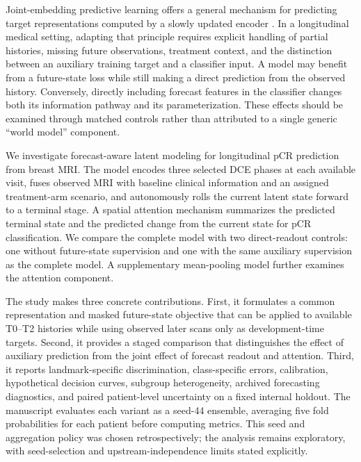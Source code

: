 Joint-embedding predictive learning offers a general mechanism for predicting target representations computed by a slowly updated encoder \citep{jepa2023}. In a longitudinal medical setting, adapting that principle requires explicit handling of partial histories, missing future observations, treatment context, and the distinction between an auxiliary training target and a classifier input. A model may benefit from a future-state loss while still making a direct prediction from the observed history. Conversely, directly including forecast features in the classifier changes both its information pathway and its parameterization. These effects should be examined through matched controls rather than attributed to a single generic ``world model'' component.

We investigate forecast-aware latent modeling for longitudinal pCR prediction from breast MRI. The model encodes three selected DCE phases at each available visit, fuses observed MRI with baseline clinical information and an assigned treatment-arm scenario, and autonomously rolls the current latent state forward to a terminal stage. A spatial attention mechanism summarizes the predicted terminal state and the predicted change from the current state for pCR classification. We compare the complete model with two direct-readout controls: one without future-state supervision and one with the same auxiliary supervision as the complete model. A supplementary mean-pooling model further examines the attention component.

The study makes three concrete contributions. First, it formulates a common representation and masked future-state objective that can be applied to available T0--T2 histories while using observed later scans only as development-time targets. Second, it provides a staged comparison that distinguishes the effect of auxiliary prediction from the joint effect of forecast readout and attention. Third, it reports landmark-specific discrimination, class-specific errors, calibration, hypothetical decision curves, subgroup heterogeneity, archived forecasting diagnostics, and paired patient-level uncertainty on a fixed internal holdout. The manuscript evaluates each variant as a seed-44 ensemble, averaging five fold probabilities for each patient before computing metrics. This seed and aggregation policy was chosen retrospectively; the analysis remains exploratory, with seed-selection and upstream-independence limits stated explicitly.
